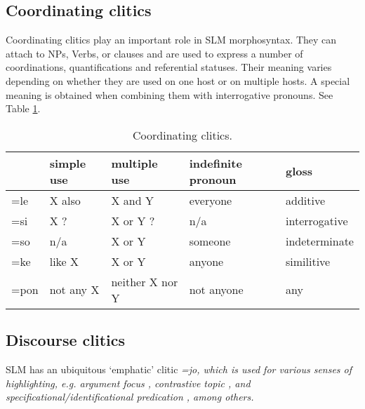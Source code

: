 \subsection{Coordinating clitics}
Coordinating clitics play an important role in SLM morphosyntax. They can attach to NPs, Verbs, or clauses and are used to express a number of coordinations, quantifications and referential statuses. Their meaning varies depending on whether they are used on one host or on multiple hosts. A special meaning is obtained when combining them with interrogative pronouns. See Table \ref{tab:coordinatingclitics}.

\begin{table}
 \begin{center}
\begin{tabular}{lllll}
 & simple use & multiple use & indefinite pronoun & gloss\\
\hline
=le & X also & X and Y & everyone & additive\\
=si & X ? & X or Y ? & n/a & interrogative\\
=so & n/a & X or Y & someone & indeterminate\\
=ke & like X & X or Y & anyone & similitive\\
=pon & not any X & neither X nor Y & not anyone & any
 \end{tabular}
  \end{center}
\caption{Coordinating clitics.}
\label{tab:coordinatingclitics}
\end{table}
 
\subsection{Discourse clitics}
SLM has an ubiquitous `emphatic' clitic \em =jo\em, which is used for various senses of highlighting, e.g.
argument focus ,  
contrastive topic ,
and specificational/identificational predication , 
among others.

% 

